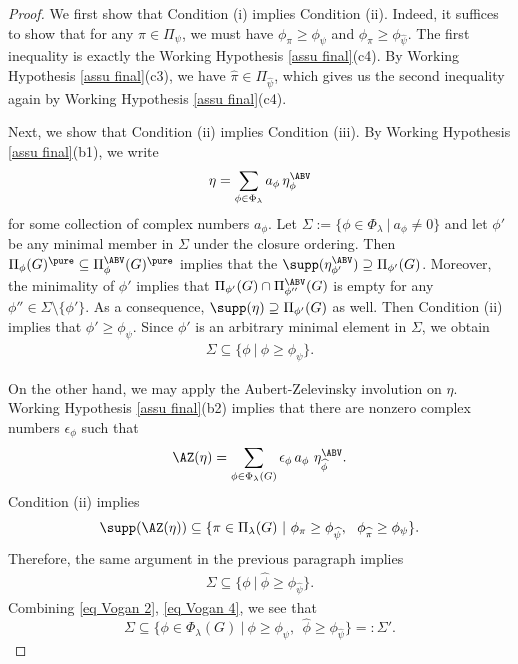 \documentclass[11pt,letterpaper]{amsart}
\numberwithin{equation}{section}
\begin{document}
\begin{proof}
We first show that Condition (i) implies Condition (ii). Indeed, it suffices to show that for any  $\pi\in \Pi_{\psi}$, we must have $\phi_{\pi}\geq \phi_{\psi}$ and $\phi_{\widehat{\pi}} \geq \phi_{\widehat{\psi}}$. The first inequality is exactly the Working Hypothesis \ref{assu final}(c4). By Working Hypothesis \ref{assu final}(c3), we have $\widehat{\pi}\in \Pi_{\widehat{\psi}}$, which gives us the second inequality again by Working Hypothesis \ref{assu final}(c4).

Next, we show that Condition (ii) implies Condition (iii). By Working Hypothesis \ref{assu final}(b1), we write
\begin{align}\label{eq Vogan 1}
     \eta= \sum_{\phi \in \Phi_{\lambda}} a_{\phi}\, \eta_{\phi}^{\ABV}
\end{align}
for some collection of complex numbers $a_{\phi}$. Let $\Sigma:= \{ \phi\in \Phi_{\lambda}\ | \ a_{\phi} \neq 0\}$ and let $\phi'$ be any minimal member in $\Sigma$ under the closure ordering. Then $\Pi_\phi(G)^\pure \subseteq \Pi^\ABV_\phi(G)^\pure$ implies that the $\supp(\eta_{\phi'}^{\ABV}) \supseteq \Pi_{\phi'}(G)$. Moreover, 
the minimality of $\phi'$ implies that $\Pi_{\phi'}(G) \cap \Pi_{\phi''}^{\ABV}(G)$ is empty for any $\phi'' \in \Sigma \setminus \{\phi'\}$. As a consequence, $\supp(\eta) \supseteq \Pi_{\phi'}(G)$ as well. Then Condition (ii) implies that $\phi' \geq \phi_{\psi}$. Since $\phi'$ is an arbitrary minimal element in $\Sigma$, we obtain
\begin{align}\label{eq Vogan 2}
    \Sigma \subseteq \{\phi \ | \ \phi \geq \phi_{\psi} \}.
\end{align}

On the other hand, we may apply the Aubert-Zelevinsky involution on $\eta$. Working Hypothesis \ref{assu final}(b2) implies that there are nonzero complex numbers $\epsilon_{\phi}$ such that
\begin{align*}
     \AZ(\eta)= \sum_{\phi \in \Phi_{\lambda}(G)} \epsilon_{\phi}\, a_{\phi}\  \eta_{\widehat{\phi}}^{\ABV}.
\end{align*}
Condition (ii) implies 
\[
\supp(\AZ(\eta))
\subseteq \{\pi\in \Pi_{\lambda}(G) \ | \ \phi_{\pi}\geq \phi_{\widehat{\psi}},\ \ \phi_{\widehat{\pi}} \geq \phi_{{\psi}} \}.
\]
Therefore, the same argument in the previous paragraph implies 
    \begin{align}\label{eq Vogan 4}
    \Sigma \subseteq \{\phi \ | \ \widehat{\phi} \geq \phi_{\widehat{\psi}} \}.
\end{align}
Combining \eqref{eq Vogan 2}, \eqref{eq Vogan 4}, we see that 
\[ \Sigma \subseteq \{ \phi\in \Phi_{\lambda}(G)\ | \ \phi\geq \phi_{\psi},\ \ \widehat{\phi} \geq {\phi_{\widehat{\psi}}}   \}=: \Sigma'.\]


\end{proof}
\end{document}
